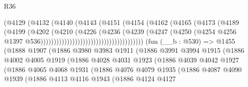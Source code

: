 \begin{lexlean}{R36}
\begin{coremodule}
                                            (@4129
                                              (@4132
                                                (@4140
                                                  (@4143
                                                    (@4151
                                                      (@4154
                                                        (@4162
                                                          (@4165
                                                            (@4173
                                                              (@4189
                                                                (@4199
                                                                  (@4202
                                                                    (@4210
                                                                      (@4226
                                                                        (@4236
                                                                          (@4239
                                                                            (@4247
                                                                              (@4250
                                                                                (@4254
                                                                                  @4256
                                                                                  @1397
                                                                                  @536)))))))))))))))))))))))))))))))))))))))
    (fun (__b : @530) =>
    @1455
      (@1888
        @1907
        (@1886
          @3980
          @3983
          @1911
          (@1886
            @3991
            @3994
            @1915
            (@1886
              @4002
              @4005
              @1919
              (@1886
                @4028
                @4031
                @1923
                (@1886
                  @4039
                  @4042
                  @1927
                  (@1886
                    @4065
                    @4068
                    @1931
                    (@1886
                      @4076
                      @4079
                      @1935
                      (@1886
                        @4087
                        @4090
                        @1939
                        (@1886
                          @4113
                          @4116
                          @1943
                          (@1886
                            @4124
                            @4127

\end{coremodule}
\end{lexlean}
